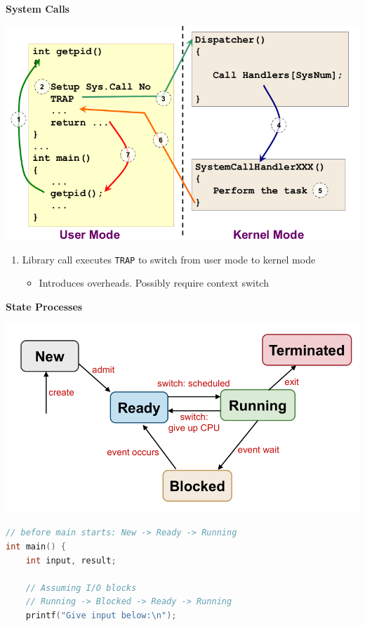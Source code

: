 \documentclass[a4paper, 12pt]{article}
\begin{document}
\begin{multicols*}{3}
\textbf{System Calls}
\begin{center}
    \includegraphics[scale=0.25]{system-call-mechanism.png}
\end{center}
\begin{enumerate}
    \item[(3)] Library call executes \texttt{TRAP} to switch from user mode to kernel mode
    \begin{itemize}
        \item Introduces overheads. Possibly require context switch
    \end{itemize} 
\end{enumerate}

\medskip

\textbf{State Processes}
\begin{center}
    \includegraphics[scale=0.42]{5stateprocessmodel.png}
\end{center}
\begin{lstlisting}[language=C]
// before main starts: New -> Ready -> Running
int main() {
    int input, result;
    
    // Assuming I/O blocks
    // Running -> Blocked -> Ready -> Running
    printf("Give input below:\n");
    

\end{lstlisting}
\end{multicols*}
\end{document}
